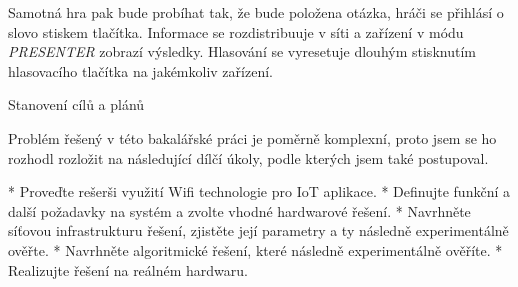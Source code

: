 Samotná hra pak bude probíhat tak, že bude položena otázka, hráči se přihlásí o slovo stiskem tlačítka. Informace se rozdistribuuje v síti a zařízení v módu {\em PRESENTER} zobrazí výsledky. Hlasování se vyresetuje dlouhým stisknutím hlasovacího tlačítka na jakémkoliv zařízení.

\sec Stanovení cílů a plánů

Problém řešený v této bakalářské práci je poměrně komplexní, proto jsem se ho rozhodl rozložit na následující dílčí úkoly, podle kterých jsem také postupoval.

\begitems
* Proveďte rešerši využití Wifi technologie pro IoT aplikace.
* Definujte funkční a další požadavky na systém a zvolte vhodné hardwarové řešení.
* Navrhněte síťovou infrastrukturu řešení, zjistěte její parametry a ty následně experimentálně ověřte.
* Navrhněte algoritmické řešení, které následně experimentálně ověříte.
* Realizujte řešení na reálném hardwaru. 

\enditems